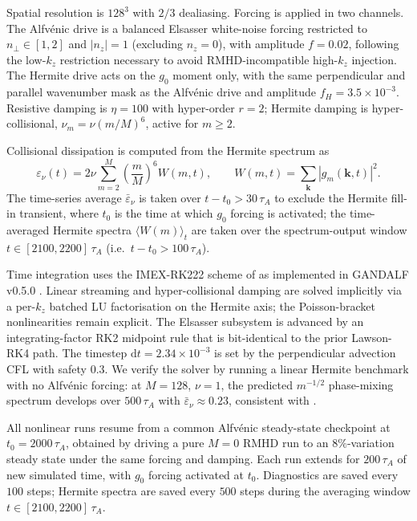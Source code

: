 \documentclass[11pt]{article}
\newcommand{\epsnu}{\varepsilon_\nu}
\newcommand{\taua}{\tau_A}
\begin{document}
Spatial resolution is $128^3$ with $2/3$ dealiasing. Forcing is applied in two channels. The Alfv\'enic drive is a balanced Elsasser white-noise forcing restricted to $n_\perp \in [1,2]$ and $|n_z| = 1$ (excluding $n_z = 0$), with amplitude $f = 0.02$, following the low-$k_z$ restriction necessary to avoid RMHD-incompatible high-$k_z$ injection. The Hermite drive acts on the $g_0$ moment only, with the same perpendicular and parallel wavenumber mask as the Alfv\'enic drive and amplitude $f_H = 3.5 \times 10^{-3}$. Resistive damping is $\eta = 100$ with hyper-order $r = 2$; Hermite damping is hyper-collisional, $\nu_m = \nu(m/M)^6$, active for $m \geq 2$.

Collisional dissipation is computed from the Hermite spectrum as
\begin{equation}
\epsnu(t) = 2\nu \sum_{m=2}^{M} \left(\frac{m}{M}\right)^6 W(m, t), \qquad W(m, t) = \sum_{\mathbf{k}} |g_m(\mathbf{k}, t)|^2.
\label{eq:eps_nu}
\end{equation}
The time-series average $\bar\epsnu$ is taken over $t - t_0 > 30\,\taua$ to exclude the Hermite fill-in transient, where $t_0$ is the time at which $g_0$ forcing is activated; the time-averaged Hermite spectra $\langle W(m)\rangle_t$ are taken over the spectrum-output window $t \in [2100, 2200]\,\taua$ (i.e.\ $t - t_0 > 100\,\taua$).

Time integration uses the IMEX-RK222 scheme of \citet{ascher1997} as implemented in GANDALF v0.5.0 \citep{gandalf}. Linear streaming and hyper-collisional damping are solved implicitly via a per-$k_z$ batched LU factorisation on the Hermite axis; the Poisson-bracket nonlinearities remain explicit. The Elsasser subsystem is advanced by an integrating-factor RK2 midpoint rule that is bit-identical to the prior Lawson-RK4 path. The timestep $\mathrm{d}t = 2.34 \times 10^{-3}$ is set by the perpendicular advection CFL with safety $0.3$. We verify the solver by running a linear Hermite benchmark with no Alfv\'enic forcing: at $M=128$, $\nu = 1$, the predicted $m^{-1/2}$ phase-mixing spectrum develops over $500\,\taua$ with $\bar\epsnu \approx 0.23$, consistent with \citet{zocco2011}.

All nonlinear runs resume from a common Alfv\'enic steady-state checkpoint at $t_0 = 2000\,\taua$, obtained by driving a pure $M = 0$ RMHD run to an $8\%$-variation steady state under the same forcing and damping. Each run extends for $200\,\taua$ of new simulated time, with $g_0$ forcing activated at $t_0$. Diagnostics are saved every $100$ steps; Hermite spectra are saved every $500$ steps during the averaging window $t \in [2100, 2200]\,\taua$.
\end{document}
